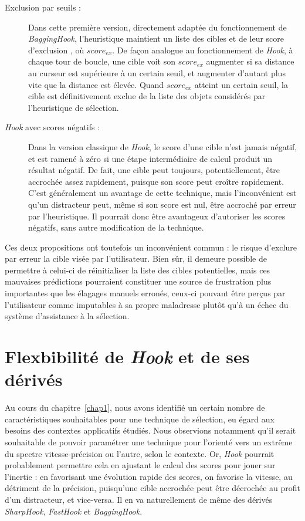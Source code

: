 	\begin{description}
		\item[Exclusion par seuils :] Dans cette première version, directement adaptée du fonctionnement de \emph{BaggingHook}, l'heuristique maintient un liste des cibles et de leur \og score d'exclusion \fg{}, où $score_{ex}$. De façon analogue au fonctionnement de \emph{Hook}, à chaque tour de boucle, une cible voit son $score_{ex}$ augmenter si sa distance au curseur est supérieure à un certain seuil, et augmenter d'autant plus vite que la distance est élevée. Quand $score_{ex}$ atteint un certain seuil, la cible est définitivement exclue de la liste des objets considérés par l'heuristique de sélection.
		\item[\emph{Hook} avec scores négatifs :] Dans la version classique de \emph{Hook}, le score d'une cible n'est jamais négatif, et est ramené à zéro si une étape intermédiaire de calcul produit un résultat négatif. De fait, une cible peut toujours, potentiellement, être accrochée assez rapidement, puisque son score peut croître rapidement. C'est généralement un avantage de cette technique, mais l'inconvénient est qu'un distracteur peut, même si son score est nul, être accroché par erreur par l'heuristique. Il pourrait donc être avantageux d'autoriser les scores négatifs, sans autre modification de la technique.
	\end{description}
	
	Ces deux propositions ont toutefois un inconvénient commun : le risque d'exclure par erreur la cible visée par l'utilisateur. Bien sûr, il demeure possible de permettre à celui-ci de réinitialiser la liste des cibles potentielles, mais ces mauvaises prédictions pourraient constituer une source de frustration plus importantes que les élagages manuels erronés, ceux-ci pouvant être perçus par l'utilisateur comme imputables à sa propre maladresse plutôt qu'à un échec du système d'assistance à la sélection.
	
\section{Flexbibilité de \emph{Hook} et de ses dérivés}
	Au cours du chapitre~\ref{chap1}, nous avons identifié un certain nombre de caractéristiques souhaitables pour une technique de sélection, eu égard aux besoins des contextes applicatifs étudiés. Nous observions notamment qu'il serait souhaitable de pouvoir paramétrer une technique pour l'orienté vers un extrême du spectre vitesse-précision ou l'autre, selon le contexte. Or, \emph{Hook} pourrait probablement permettre cela en ajustant le calcul des scores pour jouer sur \og l'inertie \fg{} : en favorisant une évolution rapide des scores, on favorise la vitesse, au détriment de la précision, puisqu'une cible accrochée peut être décrochée au profit d'un distracteur, et vice-versa. Il en va naturellement de même des dérivés \emph{SharpHook}, \emph{FastHook} et \emph{BaggingHook}.
	
